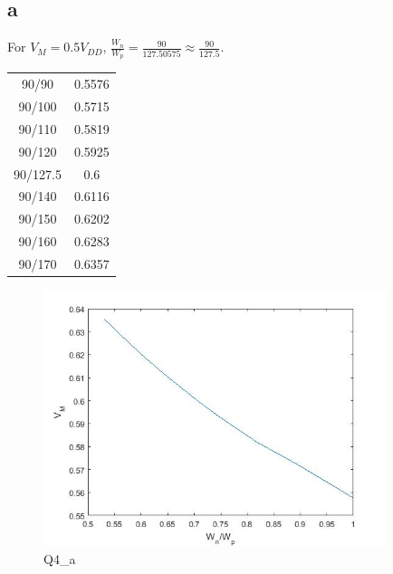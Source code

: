 \documentclass[a4paper,10pt]{article}
\begin{document}
\subsection*{a}
For \begin{math}V_{M} = 0.5V_{DD}\end{math}, \begin{math}\frac{W_n}{W_p} = \frac{90}{127.50575} \approx \frac{90}{127.5}\end{math}.\\
\begin{tabular}{c|c}
 90/90	&	0.5576\\
 90/100	&	0.5715\\
 90/110	&	0.5819\\
 90/120	&	0.5925\\
 90/127.5	&	0.6\\
 90/140	&	0.6116\\
 90/150	&	0.6202\\
 90/160	&	0.6283\\
 90/170	&	0.6357\\
\end{tabular}
\begin{figure}
 \centering
 \includegraphics[width=10cm]{Q4_a.jpg}
 \caption{Q4\_a}
\end{figure}
\end{document}
